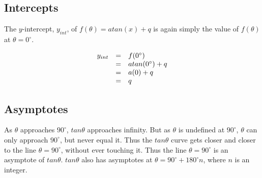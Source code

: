 \subsection*{Intercepts}
\nopagebreak
The $y$-intercept, ${y}_{int}$, of $f(\theta )=atan(x)+q$ is again simply the value of $f(\theta )$ at $\theta ={0}^{\circ }$.\par 
\nopagebreak\noindent{}
\begin{equation*}
\begin{array}{ccc}\hfill {y}_{int}& =& f({0}^{\circ })\hfill \\ & =& atan({0}^{\circ })+q\hfill \\ & =& a(0)+q\hfill \\ & =& q\hfill \end{array}
\end{equation*}

\subsection*{Asymptotes}
\nopagebreak
As $\theta $ approaches ${90}^{\circ }$, $tan\theta $ approaches infinity. But as $\theta $ is undefined at ${90}^{\circ }$, $\theta $ can only approach ${90}^{\circ }$, but never equal it. Thus the $tan\theta $ curve gets closer and closer to the line $\theta ={90}^{\circ }$, without ever touching it. Thus the line $\theta ={90}^{\circ }$ is an asymptote of $tan\theta $. $tan\theta $ also has asymptotes at $\theta ={90}^{\circ }+{180}^{\circ }n$, where $n$ is an integer.\par 

